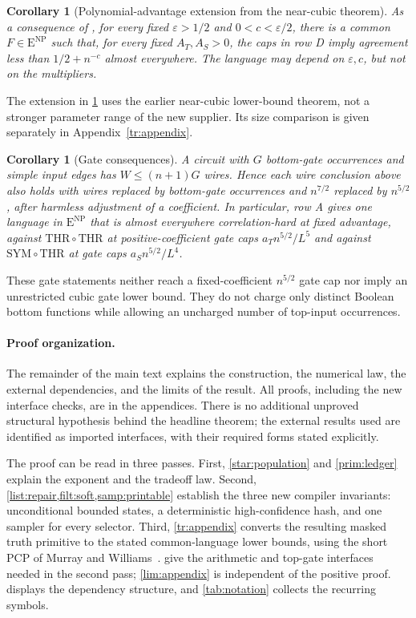 \documentclass[11pt,letterpaper]{article}
\newtheorem{corollary}[theorem]{Corollary}
\theoremstyle{definition}
\theoremstyle{remark}
\newcommand{\THR}{\mathrm{THR}}
\newcommand{\SYM}{\mathrm{SYM}}
\newcommand{\ENP}{\mathrm{E}^{\mathrm{NP}}}
\begin{document}
\begin{corollary}[Polynomial-advantage extension from the near-cubic theorem]
\label{cor:poly-prior}
As a consequence of \cite[Theorem~2.3]{NagCubic}, for every fixed
$\varepsilon>1/2$ and $0<c<\varepsilon/2$, there is a common
$F\in\ENP$ such that, for every fixed $A_T,A_S>0$, the caps in row D
imply agreement less than $1/2+n^{-c}$ almost everywhere.
The language may depend on $\varepsilon,c$, but not on the multipliers.
\end{corollary}

The extension in \cref{cor:poly-prior} uses the earlier near-cubic
lower-bound theorem, not a stronger parameter range of the new supplier.
Its size comparison is given separately in Appendix~\ref{tr:appendix}.

\begin{corollary}[Gate consequences]
\label{cor:gates}
A circuit with $G$ bottom-gate occurrences and simple input edges has
$W\le(n+1)G$ wires. Hence each wire conclusion above also holds with wires
replaced by bottom-gate occurrences and $n^{7/2}$ replaced by
$n^{5/2}$, after harmless adjustment of a coefficient. In particular,
row A gives one language in $\ENP$ that is almost everywhere
correlation-hard at fixed advantage, against $\THR\circ\THR$ at
positive-coefficient gate caps $a_Tn^{5/2}/L^5$ and against
$\SYM\circ\THR$ at gate caps $a_Sn^{5/2}/L^4$.
\end{corollary}

These gate statements neither reach a fixed-coefficient $n^{5/2}$ gate
cap nor imply an unrestricted cubic gate lower bound. They do not
charge only distinct Boolean bottom functions while allowing an
uncharged number of top-input occurrences.

\paragraph{Proof organization.}
The remainder of the main text explains the construction, the numerical
law, the external dependencies, and the limits of the result. All proofs,
including the new interface checks, are in the appendices. There is no
additional unproved structural hypothesis behind the headline theorem;
the external results used are identified as imported interfaces, with
their required forms stated explicitly.

The proof can be read in three passes. First, \cref{star:population}
and \cref{prim:ledger} explain the exponent and the tradeoff law.
Second, \cref{list:repair,filt:soft,samp:printable} establish the three
new compiler invariants: unconditional bounded states, a deterministic
high-confidence hash, and one sampler for every selector. Third,
\cref{tr:appendix} converts the resulting masked truth primitive to the
stated common-language lower bounds, using the short PCP of Murray and
Williams~\cite{MW20}. 
give the arithmetic and top-gate interfaces needed in the second pass;
\cref{lim:appendix} is independent of the positive proof.
 displays the dependency structure, and
\cref{tab:notation} collects the recurring symbols.
\end{document}
